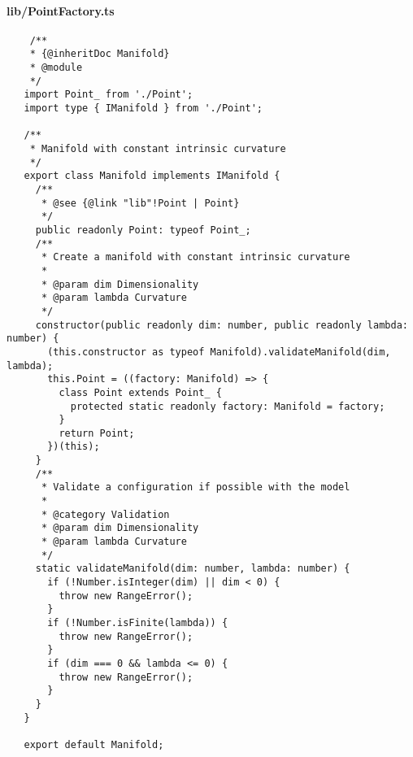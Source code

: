\documentclass[../main.tex]{subfiles}
\begin{document}
\paragraph{lib/PointFactory.ts}
\begin{verbatim}
    /**
    * {@inheritDoc Manifold}
    * @module
    */
   import Point_ from './Point';
   import type { IManifold } from './Point';
   
   /**
    * Manifold with constant intrinsic curvature
    */
   export class Manifold implements IManifold {
     /**
      * @see {@link "lib"!Point | Point}
      */
     public readonly Point: typeof Point_;
     /**
      * Create a manifold with constant intrinsic curvature
      *
      * @param dim Dimensionality
      * @param lambda Curvature
      */
     constructor(public readonly dim: number, public readonly lambda: number) {
       (this.constructor as typeof Manifold).validateManifold(dim, lambda);
       this.Point = ((factory: Manifold) => {
         class Point extends Point_ {
           protected static readonly factory: Manifold = factory;
         }
         return Point;
       })(this);
     }
     /**
      * Validate a configuration if possible with the model
      *
      * @category Validation
      * @param dim Dimensionality
      * @param lambda Curvature
      */
     static validateManifold(dim: number, lambda: number) {
       if (!Number.isInteger(dim) || dim < 0) {
         throw new RangeError();
       }
       if (!Number.isFinite(lambda)) {
         throw new RangeError();
       }
       if (dim === 0 && lambda <= 0) {
         throw new RangeError();
       }
     }
   }
   
   export default Manifold;
\end{verbatim}
\end{document}
